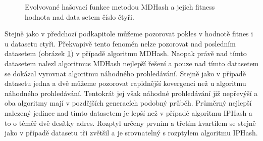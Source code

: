 \begin{figure}[!ht]
	\centering
	\caption{Evolvované hašovací funkce metodou MDHash a jejich fitness hodnota nad data setem číslo čtyři.}
	\label{fig:MDComparison4}
\end{figure}

Stejně jako v předchozí podkapitole můžeme pozorovat pokles v hodnotě fitnes i u datasetu ctyři. Překvapivě
tento fenomén nelze pozorovat nad posledním datasetem (obrázek \ref{fig:MDComparison4}) v případě algoritmu MDHash. Naopak právě nad tímto datasetem
nalezl algoritmus MDHash nejlepší řešení a pouze nad tímto datasetem se dokázal vyrovnat algoritmu náhodného prohledávání.
Stejně jako v případě datasetu jedna a dvě můžeme pozorovat rapidnější kovergenci než u algoritmu náhodného prohledávání.
Tentokrát jej však náhodné prohledávání již nepřevýší a oba algoritmy mají v pozdějších generacích podobný průběh. Průměrný 
nejlepší nalezený jedinec nad tímto datasetem je lepší než v případě algoritmu IPHash a to o téměř dvě desítky adres. Rozptyl
určeny prvním a třetím kvartilem se stejně jako v případě datasetu tři zvětšil a je srovnatelný s rozptylem algoritmu IPHash.

